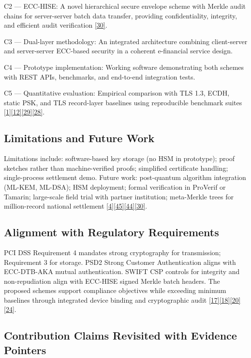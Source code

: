 \indent C2 --- ECC-HISE: A novel hierarchical secure envelope scheme with Merkle audit chains for server-server batch data transfer, providing confidentiality, integrity, and efficient audit verification \hyperref[ref:30]{[30]}.

\indent C3 --- Dual-layer methodology: An integrated architecture combining client-server and server-server ECC-based security in a coherent e-financial service design.

\indent C4 --- Prototype implementation: Working software demonstrating both schemes with REST APIs, benchmarks, and end-to-end integration tests.

\indent C5 --- Quantitative evaluation: Empirical comparison with TLS 1.3, ECDH, static PSK, and TLS record-layer baselines using reproducible benchmark suites \hyperref[ref:1]{[1]}\hyperref[ref:12]{[12]}\hyperref[ref:29]{[29]}\hyperref[ref:28]{[28]}.

\subsection{Limitations and Future Work}

\indent Limitations include: software-based key storage (no HSM in prototype); proof sketches rather than machine-verified proofs; simplified certificate handling; single-process settlement demo. Future work: post-quantum algorithm integration (ML-KEM, ML-DSA); HSM deployment; formal verification in ProVerif or Tamarin; large-scale field trial with partner institution; meta-Merkle trees for million-record national settlement \hyperref[ref:4]{[4]}\hyperref[ref:45]{[45]}\hyperref[ref:44]{[44]}\hyperref[ref:30]{[30]}.

\subsection{Alignment with Regulatory Requirements}

\indent PCI DSS Requirement 4 mandates strong cryptography for transmission; Requirement 3 for storage. PSD2 Strong Customer Authentication aligns with ECC-DTB-AKA mutual authentication. SWIFT CSP controls for integrity and non-repudiation align with ECC-HISE signed Merkle batch headers. The proposed schemes support compliance objectives while exceeding minimum baselines through integrated device binding and cryptographic audit \hyperref[ref:17]{[17]}\hyperref[ref:18]{[18]}\hyperref[ref:20]{[20]}\hyperref[ref:24]{[24]}.

\subsection{Contribution Claims Revisited with Evidence Pointers}


